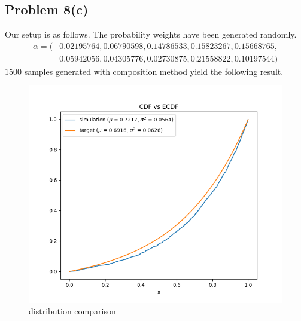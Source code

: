 \documentclass{article}
\begin{document}
\subsection*{Problem 8(c)}
Our setup is as follows. The probability weights have been generated randomly.
\begin{align*}
  \bar\alpha = (& 0.02195764, 0.06790598, 0.14786533, 0.15823267, 0.15668765,\\
   & 0.05942056, 0.04305776, 0.02730875, 0.21558822, 0.10197544)
\end{align*}
$1500$ samples generated with composition method yield the following result.
\begin{figure}[h!]
    \centering
    \includegraphics[width=\linewidth]{../images/p8c_5_1500.png}
    \caption{distribution comparison}
\end{figure}
\newpage
\end{document}
